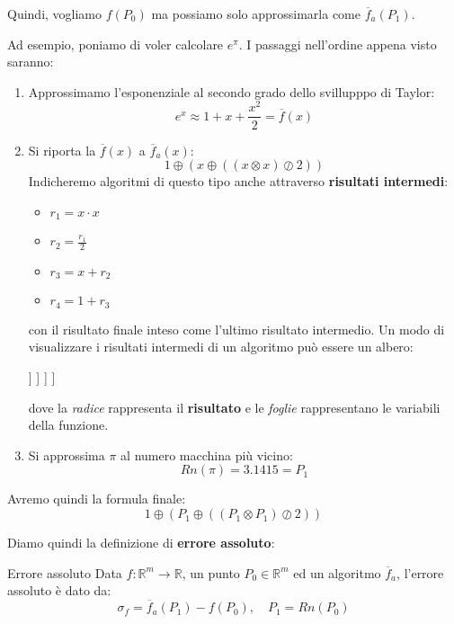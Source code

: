 \documentclass[a4paper,11pt]{article}
\begin{document}
Quindi, vogliamo $f(P_0)$ ma possiamo solo approssimarla come $\overline{f}_a(P_1)$.

Ad esempio, poniamo di voler calcolare $e^\pi$.
I passaggi nell'ordine appena visto saranno:
\begin{enumerate}
	\item Approssimamo l'esponenziale al secondo grado dello svillupppo di Taylor:
		$$
			e^x \approx 1 + x + \frac{x^2}{2} = \overline{f}(x)
		$$
	\item Si riporta la $\overline{f}(x)$ a $\overline{f}_a(x)$:
		$$
			1 \oplus \left( x \oplus ( (x \otimes x) \oslash 2) \right)
		$$
		Indicheremo algoritmi di questo tipo anche attraverso \textbf{risultati intermedi}:
		\begin{itemize}
			\item $r_1 = x \cdot x$
			\item $r_2 = \frac{r_1}{2}$
			\item $r_3 = x + r_2$
			\item $r_4 = 1 + r_3$
		\end{itemize}
		con il risultato finale inteso come l'ultimo risultato intermedio.
		Un modo di visualizzare i risultati intermedi di un algoritmo può essere un albero:
		\begin{center}
			\begin{forest}
				[
					{$r_4 = 1 + r_3$}
					[
						{$r_3 = x + r_2$}
						[
							{$r_2 = \frac{r_1}{2}$}
							[
								{$r_1 = x \cdot x$}
								[$x$]
								[$x$]
							]
						]
					]
				]
			\end{forest}
		\end{center}
		dove la \textit{radice} rappresenta il \textbf{risultato} e le \textit{foglie} rappresentano le variabili della funzione.
	\item Si approssima $\pi$ al numero macchina più vicino:
		$$
			Rn(\pi) = 3.1415 = P_1
		$$
\end{enumerate}

Avremo quindi la formula finale:
$$
1 \oplus \left( P_1 \oplus ( (P_1 \otimes P_1) \oslash 2) \right)
$$

\par\medskip

Diamo quindi la definizione di \textbf{errore assoluto}:
\begin{definition}{Errore assoluto}
	Data $f : \mathbb{R}^m \rightarrow \mathbb{R}$, un punto $P_0 \in \mathbb{R}^m$ ed un algoritmo $\overline{f}_a$, l'errore assoluto è dato da:
	$$
		\sigma_f = \overline{f}_a (P_1) - f(P_0), \quad P_1 = Rn(P_0)
	$$
\end{definition}
\end{document}
